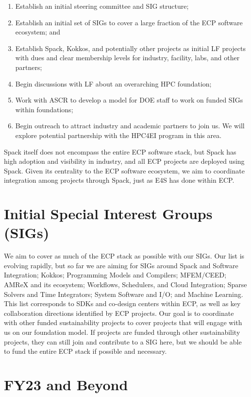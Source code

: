 \documentclass[11pt]{article}
\begin{document}
\begin{enumerate}
\item Establish an initial steering committee and SIG structure;
\item Establish an initial set of SIGs to cover a large fraction of the ECP software
  ecosystem; and
\item Establish Spack, Kokkos, and potentially other projects as initial LF projects with dues and
  clear membership levels for industry, facility, labs, and other partners;
\item Begin discussions with LF about an overarching HPC foundation;
\item Work with ASCR to develop a model for DOE staff to work on funded SIGs within
  foundations;
\item Begin outreach to attract industry and academic partners to join us. We will explore
  potential partnership with the HPC4EI program in this area.
\end{enumerate}

Spack itself does not encompass the entire ECP software stack, but Spack has high
adoption and visibility in industry, and all ECP projects are deployed using Spack.
Given its centrality to the ECP software ecosystem, we aim to coordinate integration
among projects through Spack, just as E4S has done within ECP.

\section{Initial Special Interest Groups (SIGs)}

We aim to cover as much of the ECP stack as possible with our SIGs. Our list
is evolving rapidly, but so far we are aiming for SIGs around Spack and Software
Integration; Kokkos; Programming Models and Compilers; MFEM/CEED; AMReX and its
ecosystem; Workflows, Schedulers, and Cloud Integration; Sparse Solvers and Time
Integrators; System Software and I/O; and Machine Learning.
%
This list corresponds to SDKs and co-design centers within ECP, as well as key
collaboration directions identified by ECP projects. Our goal is to coordinate with
other funded sustainability projects to cover projects that will engage with us on
our foundation model. If projects are funded through other sustainability
projects, they can still join and contribute to a SIG here, but we should be able to fund
the entire ECP stack if possible and necessary.

\section{FY23 and Beyond}
\end{document}
